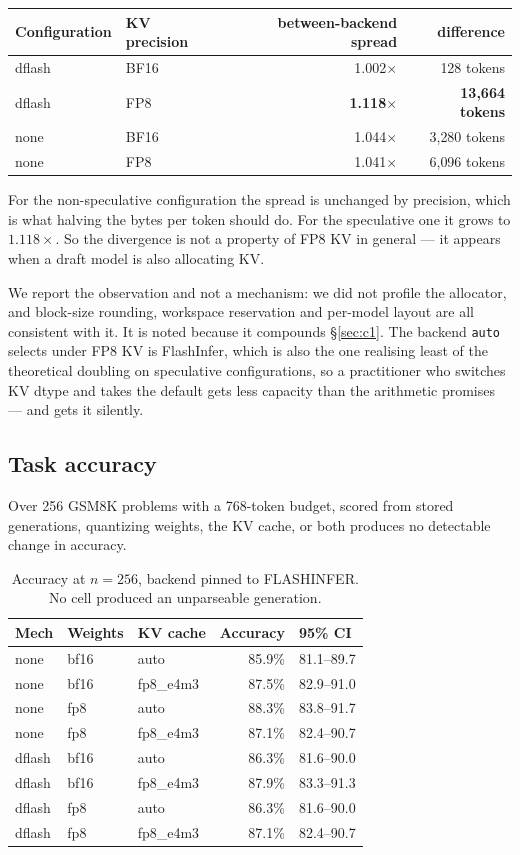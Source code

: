 \documentclass[11pt]{article}
\newcommand{\tw}[1]{\texttt{\small #1}}
\begin{document}
\begin{table}[h]\centering\small
\begin{tabular}{llrr}
\toprule
Configuration & KV precision & between-backend spread & difference\\
\midrule
dflash & BF16 & 1.002$\times$ & 128 tokens\\
dflash & FP8 & \textbf{1.118$\times$} & \textbf{13{,}664 tokens}\\
none & BF16 & 1.044$\times$ & 3{,}280 tokens\\
none & FP8 & 1.041$\times$ & 6{,}096 tokens\\
\bottomrule
\end{tabular}
\end{table}

\noindent
For the non-speculative configuration the spread is unchanged by precision,
which is what halving the bytes per token should do. For the speculative one
it grows to $1.118\times$. So the divergence is not a
property of FP8 KV in general --- it appears when a draft model is also
allocating KV.

We report the observation and not a mechanism: we did not profile the
allocator, and block-size rounding, workspace reservation and per-model
layout are all consistent with it. It is noted because it compounds
\S\ref{sec:c1}. The backend \tw{auto} selects under FP8 KV is FlashInfer,
which is also the one realising least of the theoretical doubling on
speculative configurations, so a practitioner who switches KV dtype and
takes the default gets less capacity than the arithmetic promises --- and
gets it silently.

\subsection{Task accuracy}

Over 256 GSM8K problems with a 768-token budget, scored from stored
generations, quantizing weights, the KV cache, or both produces no detectable
change in accuracy.

\begin{table}[h]\centering\small
\caption{Accuracy at $n=256$, backend pinned to FLASHINFER. No cell produced
an unparseable generation.}
\begin{tabular}{lllrl}
\toprule
Mech & Weights & KV cache & Accuracy & 95\% CI\\
\midrule
none & bf16 & auto & 85.9\% & 81.1--89.7\\
none & bf16 & fp8\_e4m3 & 87.5\% & 82.9--91.0\\
none & fp8 & auto & 88.3\% & 83.8--91.7\\
none & fp8 & fp8\_e4m3 & 87.1\% & 82.4--90.7\\
dflash & bf16 & auto & 86.3\% & 81.6--90.0\\
dflash & bf16 & fp8\_e4m3 & 87.9\% & 83.3--91.3\\
dflash & fp8 & auto & 86.3\% & 81.6--90.0\\
dflash & fp8 & fp8\_e4m3 & 87.1\% & 82.4--90.7\\
\bottomrule
\end{tabular}
\end{table}
\end{document}
